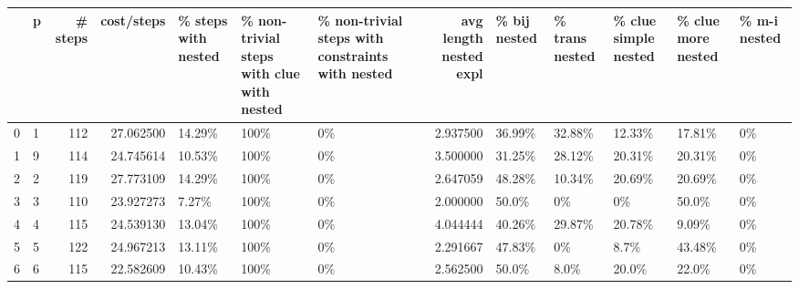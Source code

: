 \begin{tabular}{llrrlllrlllll}
\toprule
{} &  p &  \# steps &  cost/steps & \% steps with nested & \% non-trivial steps with clue with nested  & \% non-trivial steps with constraints with nested &  avg length nested expl & \% bij nested & \% trans nested & \% clue simple nested & \% clue more nested & \% m-i nested \\
\midrule
0 &  1 &      112 &   27.062500 &              14.29\% &                                       100\% &                                               0\% &                2.937500 &       36.99\% &         32.88\% &               12.33\% &             17.81\% &           0\% \\
1 &  9 &      114 &   24.745614 &              10.53\% &                                       100\% &                                               0\% &                3.500000 &       31.25\% &         28.12\% &               20.31\% &             20.31\% &           0\% \\
2 &  2 &      119 &   27.773109 &              14.29\% &                                       100\% &                                               0\% &                2.647059 &       48.28\% &         10.34\% &               20.69\% &             20.69\% &           0\% \\
3 &  3 &      110 &   23.927273 &               7.27\% &                                       100\% &                                               0\% &                2.000000 &        50.0\% &             0\% &                   0\% &              50.0\% &           0\% \\
4 &  4 &      115 &   24.539130 &              13.04\% &                                       100\% &                                               0\% &                4.044444 &       40.26\% &         29.87\% &               20.78\% &              9.09\% &           0\% \\
5 &  5 &      122 &   24.967213 &              13.11\% &                                       100\% &                                               0\% &                2.291667 &       47.83\% &             0\% &                 8.7\% &             43.48\% &           0\% \\
6 &  6 &      115 &   22.582609 &              10.43\% &                                       100\% &                                               0\% &                2.562500 &        50.0\% &           8.0\% &                20.0\% &              22.0\% &           0\% \\

\end{tabular}
